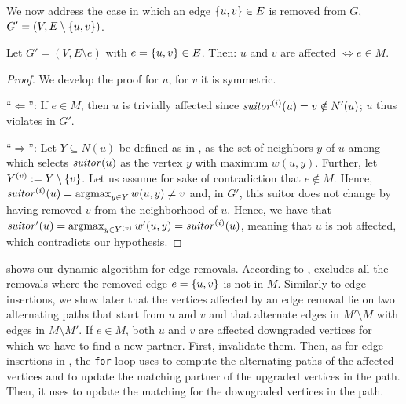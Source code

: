 

We now address the case in which an edge $\set{u, v} \in E$ is removed from
$G$, \ie $G' = (V, E \setminus \set{u, v})$.

\begin{lemma}
\label{lemma:dyn-mwm:edge-removal}
Let $G' = (V, E \setminus e)$ with $e = \set{u, v} \in E$. Then: $u$ and $v$
are affected $\Leftrightarrow e \in M$.
\end{lemma}

\begin{proof}
We develop the proof \wilog for $u$, for $v$ it is symmetric.

\enquote{$\Leftarrow$}: If $e \in M$, then $u$ is trivially affected since
$\mathit{suitor}^{(i)}(u) = v \notin N'(u)$; $u$ thus violates  in
$G'$.

\enquote{$\Rightarrow$}:
Let $Y \subseteq N(u)$ be defined as in
, \ie as the set of neighbors $y$ of $u$
among which  selects $\mathit{suitor}(u)$ as the vertex $y$ with
maximum $w(u, y)$. Further, let $Y^{(v)} := Y \setminus \set{v}$. Let us assume
for sake of contradiction that $e \notin M$. Hence, $\mathit{suitor}^{(i)}(u) =
\operatorname*{argmax}_{y \in Y} w(u, y) \neq v$ and, in $G'$, this suitor does not change by
having removed $v$ from the neighborhood of $u$. Hence, we have that
$\mathit{suitor}'(u) = \operatorname*{argmax}_{y \in Y^{(v)}}w'(u, y) = \mathit{suitor}^{(i)}(u)$, meaning
that $u$ is not affected, which contradicts our hypothesis.
\end{proof}

 shows our dynamic algorithm for edge
removals. According to ,
 excludes all the removals where the
removed edge $e = \set{u, v}$ is not in $M$. Similarly to edge insertions, we
show later that the vertices affected by an edge removal lie on two alternating
paths that start from $u$ and $v$ and that alternate edges in $M'\setminus M$
with edges in $M\setminus M'$. If $e \in M$, both $u$ and $v$ are affected
downgraded vertices for which we have to find a new partner. First,
 invalidate
them. Then, as for edge insertions in , the
\texttt{for}-loop uses \findaff to compute the alternating paths of the
affected vertices and to update the matching partner of the upgraded vertices
in the path. Then, it uses \updateaff to update the matching for the downgraded
vertices in the path.

